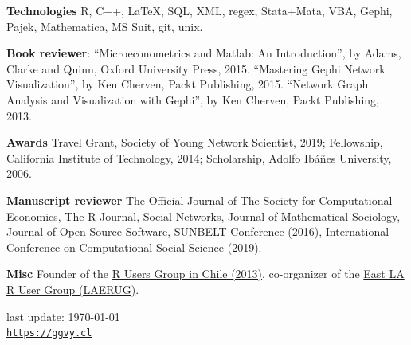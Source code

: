 \documentclass[letterpaper, 11pt]{article}
\def\footerlink{https://ggvy.cl}
\renewenvironment{itemize}{
  \begin{list}{}{
    \setlength{\leftmargin}{0.45cm}
  }
}{
  \end{list}
}
\begin{document}
\begin{itemize}
\item \textbf{Technologies} R, C++, \LaTeX, SQL, XML, regex, Stata+Mata, VBA, Gephi, Pajek, Mathematica, MS Suit, git, unix.
\item \textbf{Book reviewer}: ``Microeconometrics and Matlab: An Introduction'', by Adams, Clarke and Quinn, Oxford University Press, 2015. ``Mastering Gephi Network Visualization'', by Ken Cherven, Packt Publishing, 2015. ``Network Graph Analysis and Visualization with Gephi'', by Ken Cherven, Packt Publishing, 2013.
\item \textbf{Awards} Travel Grant, Society of Young Network Scientist, 2019; Fellowship, California Institute of Technology, 2014; Scholarship, Adolfo Ib\'a\~nes University, 2006.
\item \textbf{Manuscript reviewer} The Official Journal of The Society for Computational Economics, The R Journal, Social Networks, Journal of Mathematical Sociology, Journal of Open Source Software, SUNBELT Conference (2016), International Conference on Computational Social Science (2019).
\item \textbf{Misc} Founder of the \href{https://www.meetup.com/useRchile/}{R Users Group in Chile (2013)}, co-organizer of the \href{https://socalr.org}{East LA R User Group (LAERUG)}.
\end{itemize}

\bigskip

\begin{center}
 \begin{footnotesize}
   last update: \today \\
   \href{\footerlink}{\texttt{\footerlink}}
 \end{footnotesize}
\end{center}
\end{document}
